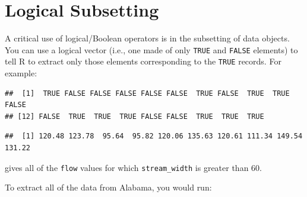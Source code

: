 \documentclass[]{book}
\newenvironment{Shaded}{\begin{snugshade}}{\end{snugshade}}
\newcommand{\DecValTok}[1]{\textcolor[rgb]{0.00,0.00,0.81}{#1}}
\newcommand{\StringTok}[1]{\textcolor[rgb]{0.31,0.60,0.02}{#1}}
\newcommand{\CommentTok}[1]{\textcolor[rgb]{0.56,0.35,0.01}{\textit{#1}}}
\newcommand{\OperatorTok}[1]{\textcolor[rgb]{0.81,0.36,0.00}{\textbf{#1}}}
\newcommand{\NormalTok}[1]{#1}
\theoremstyle{definition}
\theoremstyle{definition}
\theoremstyle{definition}
\theoremstyle{remark}
\begin{document}
\section{Logical Subsetting}\label{logsub}

A critical use of logical/Boolean operators is in the subsetting of data
objects. You can use a logical vector (i.e., one made of only
\texttt{TRUE} and \texttt{FALSE} elements) to tell R to extract only
those elements corresponding to the \texttt{TRUE} records. For example:

\begin{Shaded}
\end{Shaded}

\begin{verbatim}
##  [1]  TRUE FALSE FALSE FALSE FALSE FALSE  TRUE FALSE  TRUE  TRUE FALSE
## [12] FALSE  TRUE  TRUE  TRUE FALSE FALSE  TRUE  TRUE  TRUE
\end{verbatim}

\begin{Shaded}
\end{Shaded}

\begin{verbatim}
##  [1] 120.48 123.78  95.64  95.82 120.06 135.63 120.61 111.34 149.54 131.22
\end{verbatim}

gives all of the \texttt{flow} values for which \texttt{stream\_width}
is greater than 60.

To extract all of the data from Alabama, you would run:

\begin{Shaded}
\end{Shaded}
\end{document}
